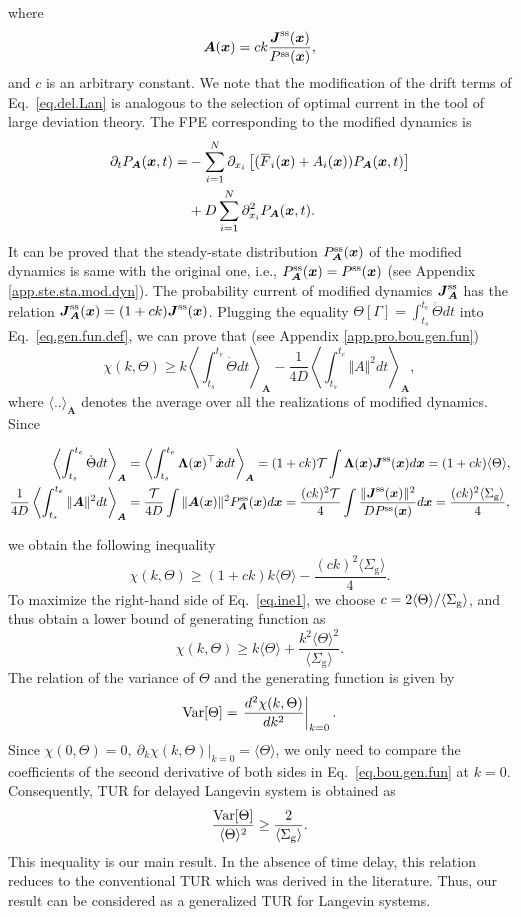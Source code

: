 \documentclass[pre,
twocolumn,
]{revtex4-1}
\newcommand{\overbar}[1]{\mkern 1.5mu\overline{\mkern-1.5mu#1\mkern-1.5mu}\mkern 1.5mu}
\theoremstyle{definition}
\theoremstyle{definition}
\newcommand{\bol}{\boldsymbol}
\newcommand{\mca}{\mathcal}
\newcommand{\mrm}{\mathrm}
\newcommand{\eq}[1]{\begin{equation}#1\end{equation}}
\newcommand{\al}[1]{\begin{align}#1\end{align}}
\newcommand{\avg}[1]{\langle #1\rangle}
\newcommand{\avgl}[1]{\left\langle #1\right\rangle}
\newcommand{\inl}[1]{$ #1 $}
\newcommand{\bras}[1]{\left[ #1 \right]}
\newcommand{\norm}[1]{\Vert #1 \Vert}
\begin{document}
where
\eq{
\bol{A}(\bol{x})=ck\frac{\bol{J}^{\rm ss}(\bol{x})}{P^{\rm ss}(\bol{x})},
}
and \inl{c} is an arbitrary constant.
We note that the modification of the drift terms of Eq.~\eqref{eq.del.Lan} is analogous to the selection of optimal current in the tool of large deviation theory.
The FPE corresponding to the modified dynamics is
\al{
\partial_t P_{\bol{A}}(\bol{x},t)=&-\sum_{i=1}^N\partial_{x_i}\bras{(\overbar{F}_i(\bol{x})+A_i(\bol{x}))P_{\bol{A}}(\bol{x},t)}\nonumber\\
&+D\sum_{i=1}^N\partial_{x_i}^2P_{\bol{A}}(\bol{x},t)\label{eq.FokPla.mod.dyn}.
}
It can be proved that the steady-state distribution \inl{P_{\bol{A}}^{\rm ss}(\bol{x})} of the modified dynamics is same with the original one, i.e., \inl{P_{\bol{A}}^{\rm ss}(\bol{x})=P^{\rm ss}(\bol{x})} (see Appendix \ref{app.ste.sta.mod.dyn}).
The probability current of modified dynamics \inl{\bol{J}_{\bol{A}}^{\rm ss}} has the relation \inl{\bol{J}_{\bol{A}}^{\rm ss}(\bol{x})=(1+ck)\bol{J}^{\rm ss}(\bol{x})}.
Plugging the equality \inl{\Theta[\Gamma]=\int_{t_s}^{t_e}\dot{\Theta}dt} into Eq.~\eqref{eq.gen.fun.def}, we can prove that (see Appendix \ref{app.pro.bou.gen.fun})
\eq{
\chi(k,\Theta)\ge k\avgl{\int_{t_s}^{t_e}\dot{\Theta}dt}_{\bol{A}}-\frac{1}{4D}\avgl{\int_{t_s}^{t_e}\norm{A}^2dt}_{\bol{A}},
}
where \inl{\avg{..}_{\bol{A}}} denotes the average over all the realizations of modified dynamics.
Since
\begin{widetext}
\al{
\avgl{\int_{t_s}^{t_e}\dot{\Theta}dt}_{\bol{A}}&=\avgl{\int_{t_s}^{t_e}\bol{\Lambda}(\bol{x})^\top\dot{\bol{x}}dt}_{\bol{A}}=(1+ck)\mca{T}\int\bol{\Lambda}(\bol{x})\bol{J}^{\rm ss}(\bol{x})d\bol{x}=(1+ck)\avg{\Theta},\\
\frac{1}{4D}\avgl{\int_{t_s}^{t_e}\norm{\bol{A}}^2dt}_{\bol{A}}&=\frac{\mca{T}}{4D}\int \norm{\bol{A}(\bol{x})}^2P_{\bol{A}}^{\rm ss}(\bol{x})d\bol{x}=\frac{(ck)^2\mca{T}}{4}\int \frac{\norm{\bol{J}^{\rm ss}(\bol{x})}^2}{DP^{\rm ss}(\bol{x})}d\bol{x}=\frac{(ck)^2\avg{\Sigma_{\mrm{g}}}}{4},
}
\end{widetext}
we obtain the following inequality
\eq{
\chi(k,\Theta)\geq (1+ck)k\avg{\Theta}-\frac{(ck)^2\avg{\Sigma_{\mrm{g}}}}{4}.\label{eq.ine1}
}
To maximize the right-hand side of Eq.~\eqref{eq.ine1}, we choose \inl{c=2\avg{\Theta}/\avg{\Sigma_{\rm g}}}, and thus obtain a lower bound of generating function as
\eq{
\chi(k,\Theta)\ge k\avg{\Theta}+\frac{k^2\avg{\Theta}^2}{\avg{\Sigma_{\mrm{g}}}}.\label{eq.bou.gen.fun}
}
The relation of the variance of \inl{\Theta} and the generating function is given by
\eq{
{\rm Var}[\Theta]=\left.\frac{d^2\chi(k,\Theta)}{dk^2}\right|_{k=0}.
}
Since \inl{\chi(0,\Theta)=0,~\partial_k\chi(k,\Theta)|_{k=0}=\avg{\Theta}}, we only need to compare the coefficients of the second derivative of both sides in Eq.~\eqref{eq.bou.gen.fun} at \inl{k=0}.
Consequently, TUR for delayed Langevin system is obtained as
\eq{
\frac{{\rm Var}[\Theta]}{\avg{\Theta}^2}\ge\frac{2}{\avg{\Sigma_{\mrm{g}}}}.\label{eq.TUR}
}
This inequality is our main result.
In the absence of time delay, this relation reduces to the conventional TUR which was derived in the literature. Thus, our result can be considered as a generalized TUR for Langevin systems.
\end{document}
